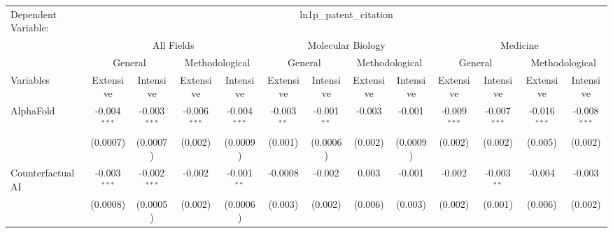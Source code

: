 \begingroup
\centering
\begin{tabular}{lcccccccccccc}
   \tabularnewline \midrule \midrule
   Dependent Variable: & \multicolumn{12}{c}{ln1p\_patent\_citation}\\
 & \multicolumn{4}{c}{All Fields} & \multicolumn{4}{c}{Molecular Biology} & \multicolumn{4}{c}{Medicine} \\
\cmidrule(lr){2-5} \cmidrule(lr){6-9} \cmidrule(lr){10-13}
 & \multicolumn{2}{c}{General} & \multicolumn{2}{c}{Methodological} & \multicolumn{2}{c}{General} & \multicolumn{2}{c}{Methodological} & \multicolumn{2}{c}{General} & \multicolumn{2}{c}{Methodological} \\
\cmidrule(lr){2-3} \cmidrule(lr){4-5} \cmidrule(lr){6-7} \cmidrule(lr){8-9} \cmidrule(lr){10-11} \cmidrule(lr){12-13}
Variables & \multicolumn{1}{c}{Extensive} & \multicolumn{1}{c}{Intensive} & \multicolumn{1}{c}{Extensive} & \multicolumn{1}{c}{Intensive} & \multicolumn{1}{c}{Extensive} & \multicolumn{1}{c}{Intensive} & \multicolumn{1}{c}{Extensive} & \multicolumn{1}{c}{Intensive} & \multicolumn{1}{c}{Extensive} & \multicolumn{1}{c}{Intensive} & \multicolumn{1}{c}{Extensive} & \multicolumn{1}{c}{Intensive} \\
\cmidrule(lr){1-1}\cmidrule(lr){2-2} \cmidrule(lr){3-3} \cmidrule(lr){4-4} \cmidrule(lr){5-5} \cmidrule(lr){6-6} \cmidrule(lr){7-7} \cmidrule(lr){8-8} \cmidrule(lr){9-9} \cmidrule(lr){10-10} \cmidrule(lr){11-11} \cmidrule(lr){12-12} \cmidrule(lr){13-13}
   AlphaFold                                & -0.004$^{***}$ & -0.003$^{***}$ & -0.006$^{***}$ & -0.004$^{***}$  & -0.003$^{**}$ & -0.001$^{**}$ & -0.003  & -0.001        & -0.009$^{***}$ & -0.007$^{***}$ & -0.016$^{***}$ & -0.008$^{***}$\\   
                                            & (0.0007)       & (0.0007)       & (0.002)        & (0.0009)        & (0.001)       & (0.0006)      & (0.002) & (0.0009)      & (0.002)        & (0.002)        & (0.005)        & (0.002)\\   
   Counterfactual AI                        & -0.003$^{***}$ & -0.002$^{***}$ & -0.002         & -0.001$^{**}$   & -0.0008       & -0.002        & 0.003   & -0.001        & -0.002         & -0.003$^{**}$  & -0.004         & -0.003\\   
                                            & (0.0008)       & (0.0005)       & (0.002)        & (0.0006)        & (0.003)       & (0.002)       & (0.006) & (0.003)       & (0.002)        & (0.001)        & (0.006)        & (0.002)\\   

\end{tabular}
